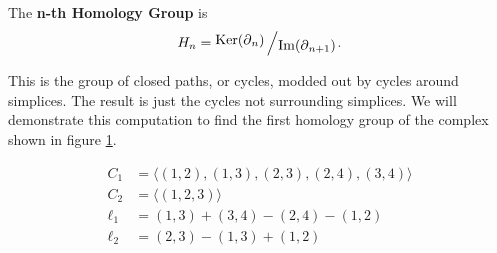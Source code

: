 
\begin{definition}\label{def:nth-homology-group}
    The \textbf{n-th Homology Group} is \[H_n = \bigslant{\Ker(\boundary_n)}{\Ima(\boundary_{n+1})}.\]
    \cite{fraleigha}
\end{definition}

This is the group of closed paths, or cycles, modded out by cycles around simplices.
The result is just the cycles not surrounding simplices.
We will demonstrate this computation to find the first homology group of the complex shown in figure \ref{fig:example-cech}.

\begin{example}

    \begin{figure}
        \centering
        \begin{minipage}{.5\textwidth}
            \centering
            
        \end{minipage}%
        \begin{minipage}{.5\textwidth}
            \begin{align*}
                C_1 &= \langle (1,2),(1,3),(2,3),(2,4),(3,4) \rangle \\
                C_2 &= \langle (1,2,3) \rangle \\
                \ell_1 &= (1,3) + (3,4) - (2,4) - (1,2)\\
                \ell_2 &= (2,3) - (1,3) + (1,2)
            \end{align*}
        \end{minipage}
        \caption{}
        \label{fig:example-cech}
    \end{figure}


\end{example}
